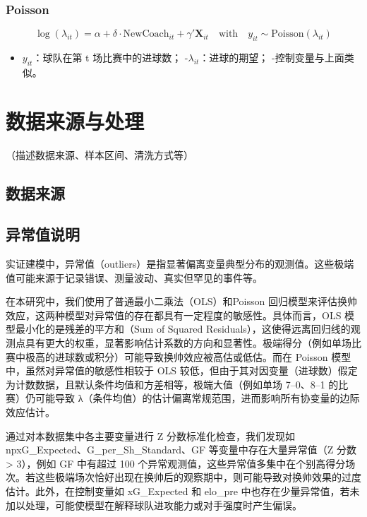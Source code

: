 \documentclass[
]{ctexart}
\providecommand{\tightlist}{%
  \setlength{\itemsep}{0pt}\setlength{\parskip}{0pt}}\usepackage{longtable,booktabs,array}
\begin{document}
\subsubsection{Poisson}\label{poisson}

\[
\log(\lambda_{it}) = \alpha + \delta \cdot \text{NewCoach}_{it} + \gamma' \mathbf{X}_{it}
\quad \text{with} \quad y_{it} \sim \text{Poisson}(\lambda_{it})
\]

\begin{itemize}
\tightlist
\item
  \(y_{it}\)：球队在第 t 场比赛中的进球数；
  -\(\lambda_{it}\)：进球的期望； -控制变量与上面类似。
\end{itemize}

\section{数据来源与处理}\label{ux6570ux636eux6765ux6e90ux4e0eux5904ux7406}

（描述数据来源、样本区间、清洗方式等）

\subsection{数据来源}\label{ux6570ux636eux6765ux6e90}

\subsection{异常值说明}\label{ux5f02ux5e38ux503cux8bf4ux660e}

实证建模中，异常值（outliers）是指显著偏离变量典型分布的观测值。这些极端值可能来源于记录错误、测量波动、真实但罕见的事件等。

在本研究中，我们使用了普通最小二乘法（OLS）和Poisson
回归模型来评估换帅效应，这两种模型对异常值的存在都具有一定程度的敏感性。具体而言，OLS
模型最小化的是残差的平方和（Sum of Squared
Residuals），这使得远离回归线的观测点具有更大的权重，显著影响估计系数的方向和显著性。极端得分（例如单场比赛中极高的进球数或积分）可能导致换帅效应被高估或低估。而在
Poisson 模型中，虽然对异常值的敏感性相较于 OLS
较低，但由于其对因变量（进球数）假定为计数数据，且默认条件均值和方差相等，极端大值（例如单场
7--0、8--1 的比赛）仍可能导致
λ（条件均值）的估计偏离常规范围，进而影响所有协变量的边际效应估计。

通过对本数据集中各主要变量进行 Z 分数标准化检查，我们发现如
npxG\_Expected、G\_per\_Sh\_Standard、GF 等变量中存在大量异常值（Z 分数
\textgreater{} 3），例如 GF 中有超过 100
个异常观测值，这些异常值多集中在个别高得分场次。若这些极端场次恰好出现在换帅后的观察期中，则可能导致对换帅效果的过度估计。此外，在控制变量如
xG\_Expected 和 elo\_pre
中也存在少量异常值，若未加以处理，可能使模型在解释球队进攻能力或对手强度时产生偏误。
\end{document}
